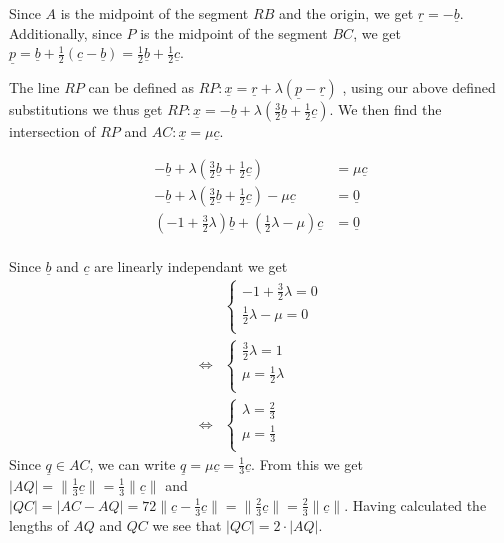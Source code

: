 \documentclass{article}
\renewcommand{\v}[1]{\underline{#1}}
\begin{document}
    Since $A$ is the midpoint of the segment $RB$ and the origin, we get $\v{r} = - \v{b}$. Additionally, since $P$ is the
    midpoint of the segment $BC$, we get $\v{p} = \v{b} + \frac{1}{2}\left(\v{c} - \v{b}\right) = \frac{1}{2} \v{b} + \frac{1}{2} \v{c}$.
    \par
    The line $RP$ can be defined as $RP: \v{x} = \v{r} + \lambda \left(\v{p} - \v{r}\right)$ \cite{vecLineRep}, using our above defined substitutions we thus get
    $RP: \v{x} = - \v{b} + \lambda \left(\frac{3}{2} \v{b} + \frac{1}{2} \v{c}\right)$. We then find the intersection of $RP$ and $AC: \v{x} = \mu \v{c}$.

    \begin{align*}
        - \v{b} + \lambda \left(\frac{3}{2} \v{b} + \frac{1}{2} \v{c}\right) &= \mu \v{c} \\
        - \v{b} + \lambda \left(\frac{3}{2} \v{b} + \frac{1}{2} \v{c}\right) - \mu \v{c} &= \v{0} \\
        \left(-1 + \frac{3}{2} \lambda\right) \v{b} + \left(\frac{1}{2}\lambda - \mu\right)\v{c} &= \v{0} \\
    \end{align*}

    Since $\v{b}$ and $\v{c}$ are linearly independant \cite{linIndepVecs} we get
    \begin{align*}
        &\begin{cases}
            -1 + \frac{3}{2} \lambda = 0 \\
            \frac{1}{2}\lambda - \mu = 0 \\
        \end{cases} \\
        \iff
        &\begin{cases}
            \frac{3}{2} \lambda = 1 \\
            \mu = \frac{1}{2} \lambda \\
        \end{cases} \\
        \iff
        &\begin{cases}
            \lambda = \frac{2}{3} \\
            \mu = \frac{1}{3} \\
        \end{cases}
    \end{align*}
    Since $\v{q} \in AC$, we can write $\v{q} = \mu \v{c} = \frac{1}{3} \v{c}$.
    From this we get $\lvert AQ \rvert = \lVert\frac{1}{3} \v{c}\rVert = \frac{1}{3}\lVert\v{c}\rVert$
    and $\lvert QC \rvert = \lvert AC - AQ\rvert = 72\lVert\v{c} - \frac{1}{3} \v{c}\rVert = \lVert\frac{2}{3} \v{c}\rVert = \frac{2}{3}\lVert\v{c}\rVert$.
    Having calculated the lengths of $AQ$ and $QC$ we see that $\lvert QC \rvert = 2 \cdot \lvert AQ \rvert$.
\end{document}
